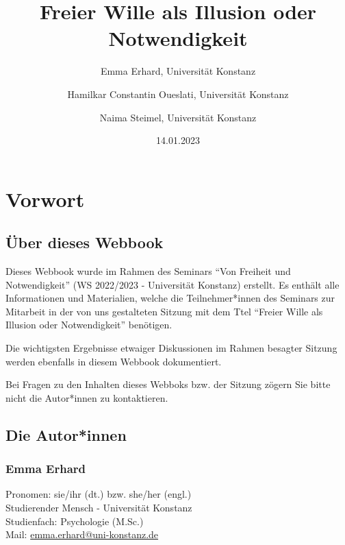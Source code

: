 \documentclass[
  a4paper,
]{report}
\title{Freier Wille als Illusion oder Notwendigkeit}
\author{Emma Erhard, Universität Konstanz \and Hamilkar Constantin Oueslati, Universität Konstanz \and Naima Steimel, Universität Konstanz}
\date{14.01.2023}
\begin{document}
\maketitle

\renewcommand*\contentsname{Inhaltsverzeichnis}
{
\hypersetup{linkcolor=}
\setcounter{tocdepth}{3}
\tableofcontents
}
\hypertarget{preface}{%
\chapter*{Vorwort}\label{preface}}

\hypertarget{about}{%
\section*{Über dieses Webbook}\label{about}}

Dieses Webbook wurde im Rahmen des Seminars ``Von Freiheit und Notwendigkeit'' (WS 2022/2023 - Universität Konstanz) erstellt. Es enthält alle Informationen und Materialien, welche die Teilnehmer*innen des Seminars zur Mitarbeit in der von uns gestalteten Sitzung mit dem Ttel ``Freier Wille als Illusion oder Notwendigkeit'' benötigen.

Die wichtigsten Ergebnisse etwaiger Diskussionen im Rahmen besagter Sitzung werden ebenfalls in diesem Webbook dokumentiert.

Bei Fragen zu den Inhalten dieses Webboks bzw. der Sitzung zögern Sie bitte nicht die Autor*innen zu kontaktieren.

\hypertarget{authors}{%
\section*{Die Autor*innen}\label{authors}}

\hypertarget{eerhard}{%
\subsection*{Emma Erhard}\label{eerhard}}

Pronomen: sie/ihr (dt.) bzw. she/her (engl.)\\
Studierender Mensch - Universität Konstanz\\
Studienfach: Psychologie (M.Sc.)\\

Mail: \href{mailto:emma.erhard@uni-konstanz.de?subject=Freier\%20Wille\%20als\%20Illusion\%20oder\%20Notwendigkeit}{emma.erhard@uni-konstanz.de}
\end{document}
